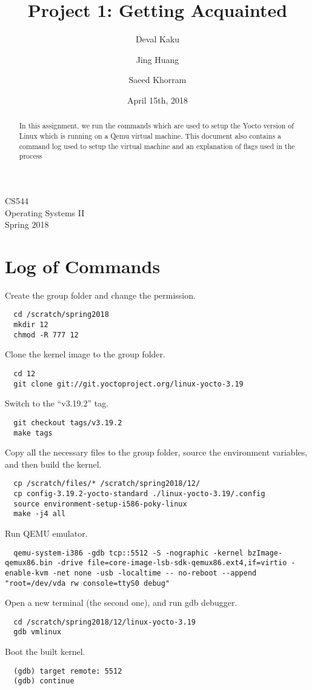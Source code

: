 \documentclass[english,10pt,letterpaper,onecolumn]{IEEEtran}
\title{Project 1: Getting Acquainted}
\author{
    Deval Kaku \hspace{.5cm}
    \and
    Jing Huang \hspace{.5cm}
    \and
    Saeed Khorram
  }
\date{April 15th, 2018}
\begin{document}
  \begin{titlepage} 
  \maketitle
  \begin{center}
  CS544\\
  Operating Systems II\\
  Spring 2018
  \vspace{50 mm}
  \end{center}
  
  \begin{abstract}
  In this assignment, we run the commands which are used to setup the Yocto version of Linux which is running on a Qemu virtual machine. This document also contains a command log used to setup the virtual machine and an explanation of flags used in the process 
  \end{abstract}
  \end{titlepage}
  
  \IEEEpeerreviewmaketitle
  \section{Log of Commands}
  \flushleft
  Create the group folder and change the permission.
  \begin{lstlisting}
  cd /scratch/spring2018
  mkdir 12
  chmod -R 777 12
  \end{lstlisting}
  Clone the kernel image to the group folder.
  \begin{lstlisting}
  cd 12
  git clone git://git.yoctoproject.org/linux-yocto-3.19
  \end{lstlisting}
  Switch to the “v3.19.2” tag.
  \begin{lstlisting}
  git checkout tags/v3.19.2
  make tags
  \end{lstlisting}
  Copy all the necessary files to the group folder, source the environment variables, and then build the kernel.
  \begin{lstlisting}
  cp /scratch/files/* /scratch/spring2018/12/
  cp config-3.19.2-yocto-standard ./linux-yocto-3.19/.config
  source environment-setup-i586-poky-linux
  make -j4 all
  \end{lstlisting}
  Run QEMU emulator.
  \begin{lstlisting}
  qemu-system-i386 -gdb tcp::5512 -S -nographic -kernel bzImage-qemux86.bin -drive file=core-image-lsb-sdk-qemux86.ext4,if=virtio -enable-kvm -net none -usb -localtime -- no-reboot --append "root=/dev/vda rw console=ttyS0 debug"
  \end{lstlisting}
  Open a new terminal (the second one), and run gdb debugger.
  \begin{lstlisting}
  cd /scratch/spring2018/12/linux-yocto-3.19
  gdb vmlinux
  \end{lstlisting}
  Boot the built kernel.
  \begin{lstlisting}
  (gdb) target remote: 5512
  (gdb) continue
  \end{lstlisting}
  
\end{document}

